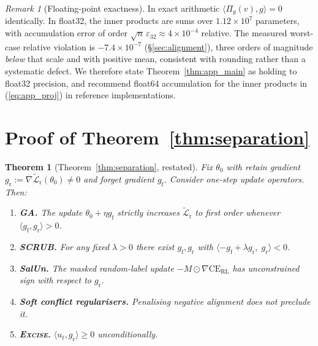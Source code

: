 \documentclass{article}
\newcommand{\ours}{\textsc{Excise}}
\newcommand{\CE}{\mathrm{CE}}
\newcommand{\gf}{g_{\mathrm{f}}}
\newcommand{\gr}{g_{\mathrm{r}}}
\newcommand{\Lrt}{\widetilde{\mathcal{L}}_{\mathrm{r}}}
\newtheorem{theorem}{Theorem}
\theoremstyle{remark}
\newtheorem{remark}{Remark}
\theoremstyle{plain}
\begin{document}
\begin{remark}[Floating-point exactness]\label{rem:float}
In exact arithmetic $\langle \Pi_g(v),g\rangle = 0$ identically. In float32, the
inner products are sums over $1.12\times10^7$ parameters, with accumulation
error of order $\sqrt{n}\,\varepsilon_{32} \approx 4\times10^{-4}$ relative.
The measured worst-case relative violation is $-7.4\times10^{-7}$
(\S\ref{sec:alignment}), three orders of magnitude \emph{below} that scale and
with positive mean, consistent with rounding rather than a systematic defect. We
therefore state Theorem~\ref{thm:app_main} as holding to float32 precision, and
recommend float64 accumulation for the inner products in
(\ref{eq:app_proj}) in reference implementations.
\end{remark}

\section{Proof of Theorem~\ref{thm:separation}}\label{app:thm2}

\begin{theorem}[Theorem~\ref{thm:separation}, restated]\label{thm:app_sep}
Fix $\theta_0$ with retain gradient $\gr := \nabla\Lrt(\theta_0) \ne 0$ and
forget gradient $\gf$. Consider one-step update operators. Then:
\begin{enumerate}
\item[(i)] \textbf{GA.} The update $\theta_0 + \eta\gf$ strictly increases
$\Lrt$ to first order whenever $\langle \gf,\gr\rangle > 0$.
\item[(ii)] \textbf{SCRUB.} For any fixed $\lambda>0$ there exist $\gf,\gr$ with
$\langle -\gf+\lambda\gr,\;\gr\rangle < 0$.
\item[(iii)] \textbf{SalUn.} The masked random-label update
$-M\odot\nabla\CE_{\mathrm{RL}}$ has unconstrained sign with respect to $\gr$.
\item[(iv)] \textbf{Soft conflict regularisers.} Penalising negative alignment
does not preclude it.
\item[(v)] \textbf{\ours{}.} $\langle u_t,\gr\rangle \ge 0$ unconditionally.
\end{enumerate}
\end{theorem}
\end{document}
